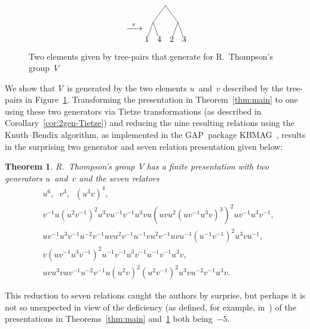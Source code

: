 \documentclass[a4paper,11pt]{article}
\numberwithin{equation}{section}
\newcommand{\GAP}{\textsf{GAP}}
\newtheorem{thm}{Theorem}[section]
\begin{document}
\begin{figure}[b]
\[\begin{tikzpicture}[
      inner sep=0pt,
      baseline=-30pt,
      level distance=20pt,
      level 1/.style={sibling distance=30pt},
      level 2/.style={sibling distance=15pt}
    ]
  \end{tikzpicture}
  \xrightarrow{\;\;v\;\;}
  \begin{tikzpicture}[
      inner sep=0pt,
      baseline=-30pt,
      level distance=20pt,
      level 1/.style={sibling distance=30pt},
      level 2/.style={sibling distance=15pt}
    ]
    \node (root) [circle,fill] {}
    child {node (0) [circle,fill] {}
      child {node (00) {$1$}}
      child {node (01) {$4$}}}
    child {node (1) [circle,fill] {}
      child {node (10) {$2$}}
      child {node (11) {$3$}}};
  \end{tikzpicture}  
  \]
  \caption{Two elements given by tree-pairs that generate for
    R.~Thompson's group~$V$}
  \label{fig:2gens}
\end{figure}

We show that $V$~is generated by the two elements $u$~and~$v$
described by the tree-pairs in Figure~\ref{fig:2gens}.  Transforming
the presentation in Theorem~\ref{thm:main} to one using these two
generators via Tietze transformations (as described in
Corollary~\ref{cor:2gen-Tietze}) and reducing the nine resulting
relations using the Knuth--Bendix algorithm, as implemented in the
\GAP\ package KBMAG~\cite{GAP,KBMAG}, results in the surprising two
generator and seven relation presentation given below:

\begin{thm}
  \label{thm:2gen-KB}
  R.~Thompson's group~$V$ has a finite presentation with two
  generators $u$~and~$v$ and the seven relators
  \begin{align*}
  &u^6, \;\; v^3, \;\; (u^{3}v)^4, \\
  &v^{-1}u(u^{2}v^{-1})^{2}u^{3}vu^{-1}v^{-1}u^{3}vu(uvu^{2}(uv^{-1}u^{3}v)^{3})^{2}uv^{-1}u^{3}v^{-1}, \\
  &uv^{-1}u^{3}v^{-1}u^{-2}v^{-1}uvu^{2}v^{-1}u^{-1}vu^{2}v^{-1}uvu^{-1}(u^{-1}v^{-1})^{2}u^{3}vu^{-1}, \\
  &v(uv^{-1}u^{3}v^{-1})^{2}u^{-1}v^{-1}u^{3}v^{-1}u^{-1}v^{-1}u^{3}v, \\
    &uvu^{3}vuv^{-1}u^{-2}v^{-1}u(u^{2}v)^{2}(u^{2}v^{-1})^{2}u^{3}vu^{-2}v^{-1}u^{3}v
    .
  \end{align*}
\end{thm}

This reduction to seven relations caught the authors by surprise,
but perhaps it is not so unexpected in view of the deficiency (as
defined, for example, in~\cite[\S14.1]{Robinson}) of the presentations
in Theorems~\ref{thm:main} and~\ref{thm:2gen-KB} both being~$-5$.
\end{document}
